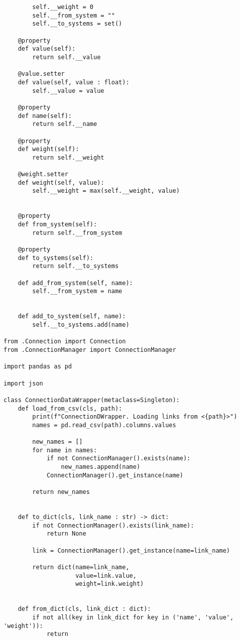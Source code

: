 {\begin{lstlisting}
        self.__weight = 0
        self.__from_system = ""
        self.__to_systems = set()
    
    @property
    def value(self):
        return self.__value

    @value.setter
    def value(self, value : float):
        self.__value = value
    
    @property
    def name(self):
        return self.__name

    @property
    def weight(self):
        return self.__weight
    
    @weight.setter
    def weight(self, value):
        self.__weight = max(self.__weight, value)
    
    
    @property
    def from_system(self):
        return self.__from_system
    
    @property
    def to_systems(self):
        return self.__to_systems
    
    def add_from_system(self, name):
        self.__from_system = name
        
        
    def add_to_system(self, name):
        self.__to_systems.add(name)
        
from .Connection import Connection
from .ConnectionManager import ConnectionManager

import pandas as pd

import json

class ConnectionDataWrapper(metaclass=Singleton):
    def load_from_csv(cls, path):
        print(f"ConnectionDWrapper. Loading links from <{path}>")
        names = pd.read_csv(path).columns.values
        
        new_names = []
        for name in names:
            if not ConnectionManager().exists(name):
                new_names.append(name)
            ConnectionManager().get_instance(name)
            
        return new_names
    
    
    def to_dict(cls, link_name : str) -> dict:
        if not ConnectionManager().exists(link_name):
            return None
        
        link = ConnectionManager().get_instance(name=link_name)
        
        return dict(name=link_name, 
                    value=link.value,
                    weight=link.weight)
    
    
    def from_dict(cls, link_dict : dict):
        if not all(key in link_dict for key in ('name', 'value', 'weight')):
            return
        

\end{lstlisting}}
